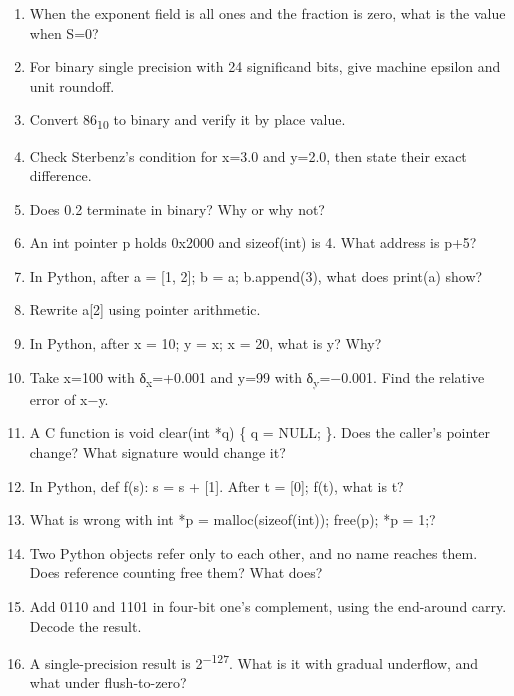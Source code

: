 \documentclass[11pt]{article}
\begin{document}
\begin{keepsection}
\begin{enumerate}
\item When the exponent field is all ones and the fraction is zero, what is the value when S=0?
\item For binary single precision with 24 significand bits, give machine epsilon and unit roundoff.
\item Convert 86\textsubscript{10} to binary and verify it by place value.
\item Check Sterbenz’s condition for x=3.0 and y=2.0, then state their exact difference.
\item Does 0.2 terminate in binary? Why or why not?
\item An int pointer p holds 0x2000 and sizeof(int) is 4. What address is p+5?
\item In Python, after a = [1, 2]; b = a; b.append(3), what does print(a) show?
\item Rewrite a[2] using pointer arithmetic.
\item In Python, after x = 10; y = x; x = 20, what is y? Why?
\item Take x=100 with δ\textsubscript{x}=+0.001 and y=99 with δ\textsubscript{y}=\ensuremath{-}0.001. Find the relative error of x\ensuremath{-}y.
\item A C function is void clear(int *q) \{ q = NULL; \}. Does the caller’s pointer change? What signature would change it?
\item In Python, def f(s): s = s + [1]. After t = [0]; f(t), what is t?
\item What is wrong with int *p = malloc(sizeof(int)); free(p); *p = 1;?
\item Two Python objects refer only to each other, and no name reaches them. Does reference counting free them? What does?
\item Add 0110 and 1101 in four-bit one’s complement, using the end-around carry. Decode the result.
\item A single-precision result is 2\textsuperscript{\ensuremath{-}127}. What is it with gradual underflow, and what under flush-to-zero?
\end{enumerate}

\end{keepsection}
\end{document}
